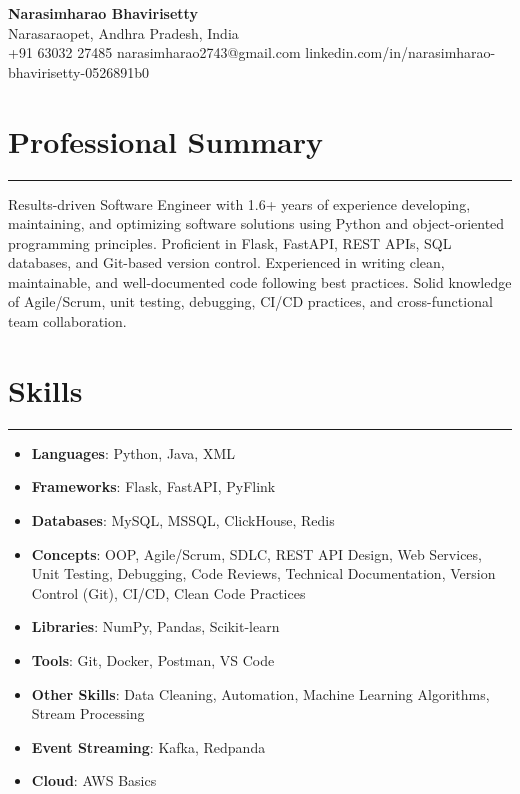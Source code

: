 \documentclass[12pt]{article}
\begin{document}
\begin{center}
  {\huge\textbf{Narasimharao Bhavirisetty}}\\[3pt]
  Narasaraopet, Andhra Pradesh, India \\[1pt]
  +91 63032 27485 \textbullet{} narasimharao2743@gmail.com \textbullet{}
  linkedin.com/in/narasimharao-bhavirisetty-0526891b0
\end{center}

\vspace{6pt}

\section*{Professional Summary}
\vspace{1pt}\hrule\vspace{4pt}
Results-driven Software Engineer with 1.6+ years of experience developing, maintaining, and optimizing software solutions using Python and object-oriented programming principles. Proficient in Flask, FastAPI, REST APIs, SQL databases, and Git-based version control. Experienced in writing clean, maintainable, and well-documented code following best practices. Solid knowledge of Agile/Scrum, unit testing, debugging, CI/CD practices, and cross-functional team collaboration.

\section*{Skills}
\vspace{1pt}\hrule\vspace{4pt}
\begin{itemize}
  \item \textbf{Languages}: Python, Java, XML
  \item \textbf{Frameworks}: Flask, FastAPI, PyFlink
  \item \textbf{Databases}: MySQL, MSSQL, ClickHouse, Redis
  \item \textbf{Concepts}: OOP, Agile/Scrum, SDLC, REST API Design, Web Services, Unit Testing, Debugging, Code Reviews, Technical Documentation, Version Control (Git), CI/CD, Clean Code Practices
  \item \textbf{Libraries}: NumPy, Pandas, Scikit-learn
  \item \textbf{Tools}: Git, Docker, Postman, VS Code
  \item \textbf{Other Skills}: Data Cleaning, Automation, Machine Learning Algorithms, Stream Processing
  \item \textbf{Event Streaming}: Kafka, Redpanda
  \item \textbf{Cloud}: AWS Basics
\end{itemize}
\end{document}

